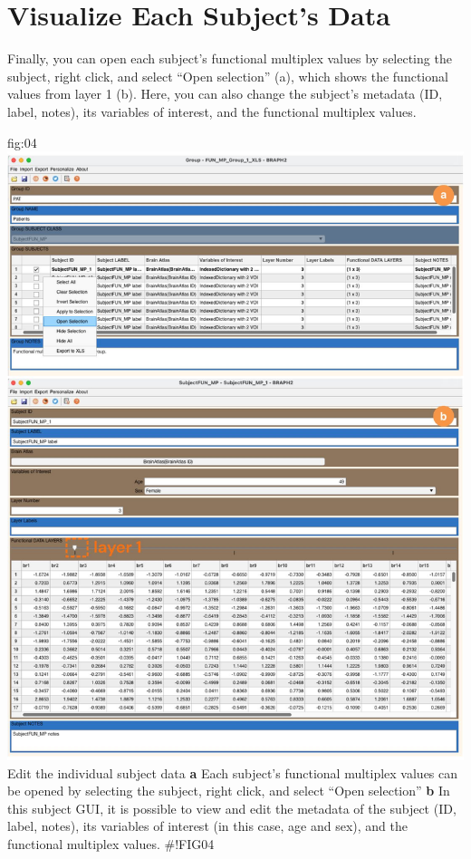\documentclass[justified]{tufte-handout}
\begin{document}
\section{Visualize Each Subject's Data}

Finally, you can open each subject's functional multiplex values by selecting the subject, right click, and select ``Open selection'' (a), which shows the functional values from layer 1 (b). Here, you can also change the subject's metadata (ID, label, notes), its variables of interest, and the functional multiplex values.

	{fig:04}
	{\includegraphics{fig04.jpg}
	}
	{Edit the individual subject data}
	{
	{\bf a}  Each subject's functional multiplex values can be opened by selecting the subject, right click, and select ``Open selection''
	{\bf b} In this subject GUI, it is possible to view and edit the metadata of the subject (ID, label, notes), its variables of interest (in this case, age and sex), and the functional multiplex values. 
	}
#!FIG04
\end{document}
